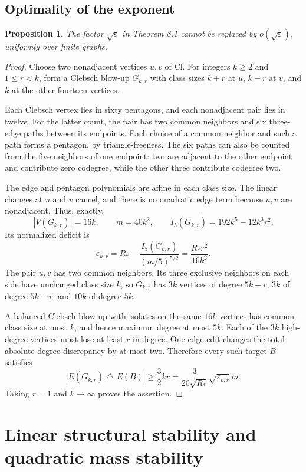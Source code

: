 \documentclass[11pt]{amsart}
\newtheorem{proposition}[theorem]{Proposition}
\theoremstyle{definition}
\theoremstyle{remark}
\begin{document}
\subsection{Optimality of the exponent}

\begin{proposition}\label{prop:sqrt-optimality}
The factor $\sqrt\varepsilon$ in Theorem 8.1 cannot be replaced by
$o(\sqrt\varepsilon)$, uniformly over finite graphs.
\end{proposition}

\begin{proof}
Choose two nonadjacent vertices $u,v$ of $\mathrm{Cl}$. For integers
$k\geq2$ and $1\leq r<k$, form a Clebsch blow-up $G_{k,r}$ with class sizes
$k+r$ at $u$, $k-r$ at $v$, and $k$ at the other fourteen vertices.

Each Clebsch vertex lies in sixty pentagons, and each nonadjacent pair lies
in twelve. For the latter count, the pair has two common neighbors and six
three-edge paths between its endpoints. Each choice of a common neighbor
and such a path forms a pentagon, by triangle-freeness. The six paths can
also be counted from the five neighbors of one endpoint: two are adjacent
to the other endpoint and contribute zero codegree, while the other three
contribute codegree two.

The edge and pentagon polynomials are affine in each class size. The linear
changes at $u$ and $v$ cancel, and there is no quadratic edge term because
$u,v$ are nonadjacent. Thus, exactly,
\[
 |V(G_{k,r})|=16k,\qquad m=40k^2,\qquad
 I_5(G_{k,r})=192k^5-12k^3r^2.
\]
Its normalized deficit is
\[
 \varepsilon_{k,r}=R_\ast-\frac{I_5(G_{k,r})}{(m/5)^{5/2}}
 =\frac{R_\ast r^2}{16k^2}.
\]
The pair $u,v$ has two common neighbors. Its three exclusive neighbors on
each side have unchanged class size $k$, so $G_{k,r}$ has $3k$ vertices of
degree $5k+r$, $3k$ of degree $5k-r$, and $10k$ of degree $5k$.

A balanced Clebsch blow-up with isolates on the same $16k$ vertices has
common class size at most $k$, and hence maximum degree at most $5k$.
Each of the $3k$ high-degree vertices must lose at least $r$ in degree. One
edge edit changes the total absolute degree discrepancy by at most two.
Therefore every such target $B$ satisfies
\[
 |E(G_{k,r})\mathbin{\triangle}E(B)|\geq\frac32kr
 =\frac3{20\sqrt{R_\ast}}\sqrt{\varepsilon_{k,r}}\,m.
\]
Taking $r=1$ and $k\to\infty$ proves the assertion.
\end{proof}

\section{Linear structural stability and quadratic mass stability}
\label{sec:linear-stability}
\end{document}
